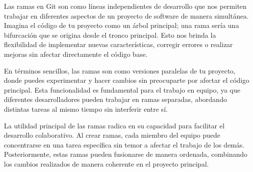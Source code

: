 
Las ramas en Git son como líneas independientes de desarrollo que nos permiten trabajar 
en diferentes aspectos de un proyecto de software de manera simultánea. Imagina el 
código de tu proyecto como un árbol principal; una rama sería una bifurcación que se 
origina desde el tronco principal. Esto nos brinda la flexibilidad de implementar 
nuevas características, corregir errores o realizar mejoras sin afectar directamente
el código base. 


En términos sencillos, las ramas son como versiones paralelas de tu proyecto, donde
puedes experimentar y hacer cambios sin preocuparte por afectar el código principal. 
Esta funcionalidad es fundamental para el trabajo en equipo, ya que diferentes 
desarrolladores pueden trabajar en ramas separadas, abordando distintas tareas al mismo 
tiempo sin interferir entre sí.


La utilidad principal de las ramas radica en su capacidad para facilitar el desarrollo 
colaborativo. Al crear ramas, cada miembro del equipo puede concentrarse en una tarea 
específica sin temor a afectar el trabajo de los demás. Posteriormente, estas ramas 
pueden fusionarse de manera ordenada, combinando los cambios realizados de manera 
coherente en el proyecto principal.

